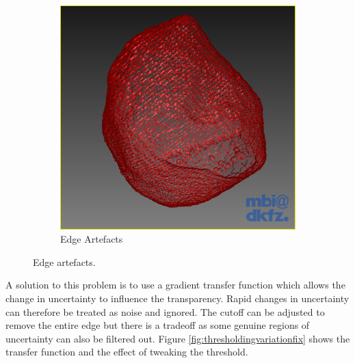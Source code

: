 \begin{figure}[h]
\begin{subfigure}[b]{0.519\textwidth}
    \includegraphics[width=\textwidth]{images/thresholding/thresholdvariation1problem.png}
    \caption{Edge Artefacts}
    \label{fig:thresholdingvariation1artefacts}
  \end{subfigure}
  \caption{Edge artefacts.}\label{fig:thresholdingvariation1problem}
\end{figure}

A solution to this problem is to use a gradient transfer function which allows the change in uncertainty to influence the transparency. Rapid changes in uncertainty can therefore be treated as noise and ignored. The cutoff can be adjusted to remove the entire edge but there is a tradeoff as some genuine regions of uncertainty can also be filtered out. Figure \ref{fig:thresholdingvariationfix} shows the transfer function and the effect of tweaking the threshold.

